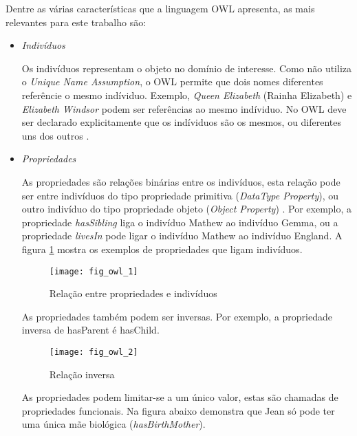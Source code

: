 Dentre as várias características que a linguagem OWL apresenta, as mais
relevantes para este trabalho são:

\begin{itemize}

    \item \textit{Indivíduos}

    Os indivíduos representam o objeto no domínio de interesse. Como não
    utiliza o \textit{Unique Name Assumption}, o OWL permite que dois nomes
    diferentes referêncie o mesmo indíviduo. Exemplo, \textit{Queen Elizabeth}
    (Rainha Elizabeth) e \textit{Elizabeth Windsor} podem ser referências ao
    mesmo indíviduo. No OWL deve ser declarado explicitamente que os indíviduos
    são os mesmos, ou diferentes uns dos outros \cite{horridge2004practical}.

    \item \textit{Propriedades}

    As propriedades são relações binárias entre os indivíduos, esta relação pode
    ser entre indivíduos do tipo propriedade primitiva
    (\textit{DataType Property}), ou outro indivíduo do tipo propriedade objeto
    (\textit{Object Property}) \cite{horridge2004practical}. Por exemplo, a
    propriedade \textit{hasSibling} liga o indivíduo Mathew ao indivíduo Gemma,
    ou a propriedade \textit{livesIn} pode ligar o indivíduo Mathew ao indivíduo
    England. A figura \ref{fig:fig_owl_1} mostra os exemplos de propriedades que ligam indivíduos.

    \begin{figure}[!h]
      \centering
      \texttt{[image: fig\_owl\_1]}
      \caption{Relação entre propriedades e indivíduos}
      \label{fig:fig_owl_1}
    \end{figure}

    As propriedades também podem ser inversas. Por exemplo, a propriedade
    inversa de hasParent é hasChild.

    \begin{figure}[!h]
      \centering
      \texttt{[image: fig\_owl\_2]}
      \caption{Relação inversa}
      \label{fig:fig_owl_2}
    \end{figure}

    \vskip 4cm

    As propriedades podem limitar-se a um único valor, estas são chamadas de
    propriedades funcionais. Na figura abaixo demonstra que Jean só pode ter
    uma única mãe biológica (\textit{hasBirthMother}).


\end{itemize}
